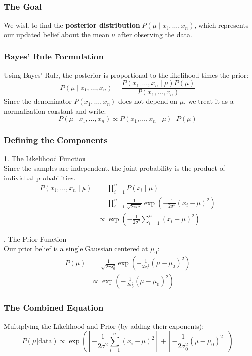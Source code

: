 \documentclass[../Probability.tex]{subfiles}
\begin{document}
\subsubsection{The Goal}
We wish to find the \textbf{posterior distribution} $P(\mu \mid x_1, \dots, x_n)$, which represents our updated belief about the mean $\mu$ after observing the data.

\subsubsection*{Bayes' Rule Formulation}
Using Bayes' Rule, the posterior is proportional to the likelihood times the prior:
\[
P(\mu \mid x_1, \dots, x_n) = \frac{P(x_1, \dots, x_n \mid \mu) P(\mu)}{P(x_1, \dots, x_n)}
\]
Since the denominator $P(x_1, \dots, x_n)$ does not depend on $\mu$, we treat it as a normalization constant and write:
\[
P(\mu \mid x_1, \dots, x_n) \propto P(x_1, \dots, x_n \mid \mu) \cdot P(\mu)
\]

\subsubsection*{Defining the Components}

1. The Likelihood Function \\
Since the samples are independent, the joint probability is the product of individual probabilities:
\begin{align*}
P(x_1, \dots, x_n \mid \mu) &= \prod_{i=1}^{n} P(x_i \mid \mu) \\
&= \prod_{i=1}^{n} \frac{1}{\sqrt{2\pi\sigma^2}} \exp\left( -\frac{1}{2\sigma^2}(x_i - \mu)^2 \right) \\
&\propto \exp\left( -\frac{1}{2\sigma^2} \sum_{i=1}^{n} (x_i - \mu)^2 \right)
\end{align*}

. The Prior Function \\
Our prior belief is a single Gaussian centered at $\mu_0$:
\begin{align*}
P(\mu) &= \frac{1}{\sqrt{2\pi\sigma_0^2}} \exp\left( -\frac{1}{2\sigma_0^2}(\mu - \mu_0)^2 \right) \\
&\propto \exp\left( -\frac{1}{2\sigma_0^2}(\mu - \mu_0)^2 \right)
\end{align*}

\subsubsection*{The Combined Equation}
Multiplying the Likelihood and Prior (by adding their exponents):
\[
P(\mu | \text{data}) \propto \exp\left( \left[ -\frac{1}{2\sigma^2} \sum_{i=1}^{n} (x_i - \mu)^2 \right] + \left[ -\frac{1}{2\sigma_0^2}(\mu - \mu_0)^2 \right] \right)
\]
\end{document}
